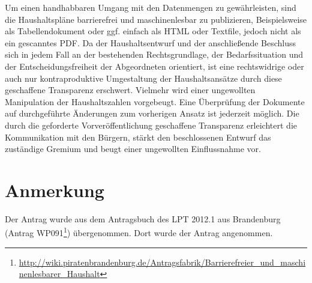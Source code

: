 Um einen handhabbaren Umgang mit den Datenmengen zu gewährleisten, sind die Haushaltspläne barrierefrei und maschinenlesbar zu publizieren, Beispielsweise als Tabellendokument oder ggf. einfach als HTML oder Textfile, jedoch nicht als ein gescanntes PDF. Da der Haushaltsentwurf und der anschließende Beschluss sich in jedem Fall an der bestehenden Rechtsgrundlage, der Bedarfssituation und der Entscheidungsfreiheit der Abgeordneten orientiert, ist eine rechtswidrige oder auch nur kontraproduktive Umgestaltung der Haushaltsansätze durch diese geschaffene Transparenz erschwert. Vielmehr wird einer ungewollten Manipulation der Haushaltszahlen vorgebeugt. Eine Überprüfung der Dokumente auf durchgeführte Änderungen zum vorherigen Ansatz ist jederzeit möglich. Die durch die geforderte Vorveröffentlichung geschaffene Transparenz erleichtert die Kommunikation mit den Bürgern, stärkt den beschlossenen Entwurf das zuständige Gremium und beugt einer ungewollten Einflussnahme vor.

\section{Anmerkung}

Der Antrag wurde aus dem Antragsbuch des LPT 2012.1 aus Brandenburg (Antrag WP091\footnote{\url{http://wiki.piratenbrandenburg.de/Antragsfabrik/Barrierefreier\_und\_maschinenlesbarer\_Haushalt}}) übergenommen. Dort wurde der Antrag angenommen.
